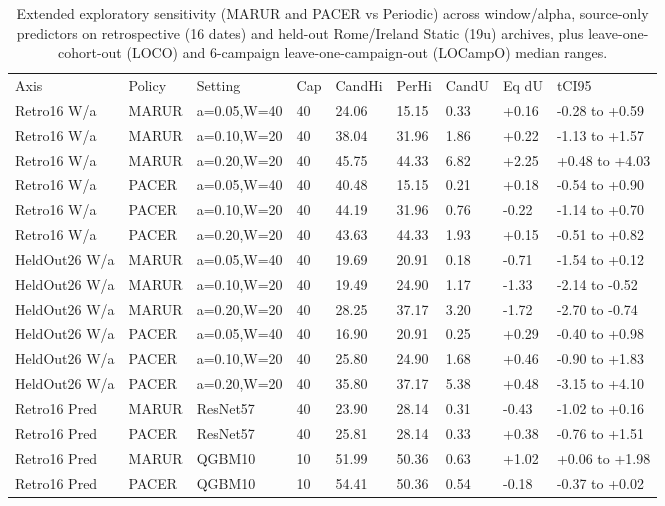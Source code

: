 \begin{table}[!ht]
\centering\footnotesize\setlength{\tabcolsep}{2.4pt}
\caption{Extended exploratory sensitivity (MARUR and PACER vs Periodic) across window/alpha, source-only predictors on retrospective (16 dates) and held-out Rome/Ireland Static (19u) archives, plus leave-one-cohort-out (LOCO) and 6-campaign leave-one-campaign-out (LOCampO) median ranges.}
\begin{tabular}{lllllllll}
\hline
Axis & Policy & Setting & Cap & CandHi & PerHi & CandU & Eq dU & tCI95 \\
Retro16 W/a & MARUR & a=0.05,W=40 & 40 & 24.06 & 15.15 & 0.33 & +0.16 & -0.28 to +0.59 \\
Retro16 W/a & MARUR & a=0.10,W=20 & 40 & 38.04 & 31.96 & 1.86 & +0.22 & -1.13 to +1.57 \\
Retro16 W/a & MARUR & a=0.20,W=20 & 40 & 45.75 & 44.33 & 6.82 & +2.25 & +0.48 to +4.03 \\
Retro16 W/a & PACER & a=0.05,W=40 & 40 & 40.48 & 15.15 & 0.21 & +0.18 & -0.54 to +0.90 \\
Retro16 W/a & PACER & a=0.10,W=20 & 40 & 44.19 & 31.96 & 0.76 & -0.22 & -1.14 to +0.70 \\
Retro16 W/a & PACER & a=0.20,W=20 & 40 & 43.63 & 44.33 & 1.93 & +0.15 & -0.51 to +0.82 \\
HeldOut26 W/a & MARUR & a=0.05,W=40 & 40 & 19.69 & 20.91 & 0.18 & -0.71 & -1.54 to +0.12 \\
HeldOut26 W/a & MARUR & a=0.10,W=20 & 40 & 19.49 & 24.90 & 1.17 & -1.33 & -2.14 to -0.52 \\
HeldOut26 W/a & MARUR & a=0.20,W=20 & 40 & 28.25 & 37.17 & 3.20 & -1.72 & -2.70 to -0.74 \\
HeldOut26 W/a & PACER & a=0.05,W=40 & 40 & 16.90 & 20.91 & 0.25 & +0.29 & -0.40 to +0.98 \\
HeldOut26 W/a & PACER & a=0.10,W=20 & 40 & 25.80 & 24.90 & 1.68 & +0.46 & -0.90 to +1.83 \\
HeldOut26 W/a & PACER & a=0.20,W=20 & 40 & 35.80 & 37.17 & 5.38 & +0.48 & -3.15 to +4.10 \\
Retro16 Pred & MARUR & ResNet57 & 40 & 23.90 & 28.14 & 0.31 & -0.43 & -1.02 to +0.16 \\
Retro16 Pred & PACER & ResNet57 & 40 & 25.81 & 28.14 & 0.33 & +0.38 & -0.76 to +1.51 \\
Retro16 Pred & MARUR & QGBM10 & 10 & 51.99 & 50.36 & 0.63 & +1.02 & +0.06 to +1.98 \\
Retro16 Pred & PACER & QGBM10 & 10 & 54.41 & 50.36 & 0.54 & -0.18 & -0.37 to +0.02 \\

\end{tabular}
\end{table}
